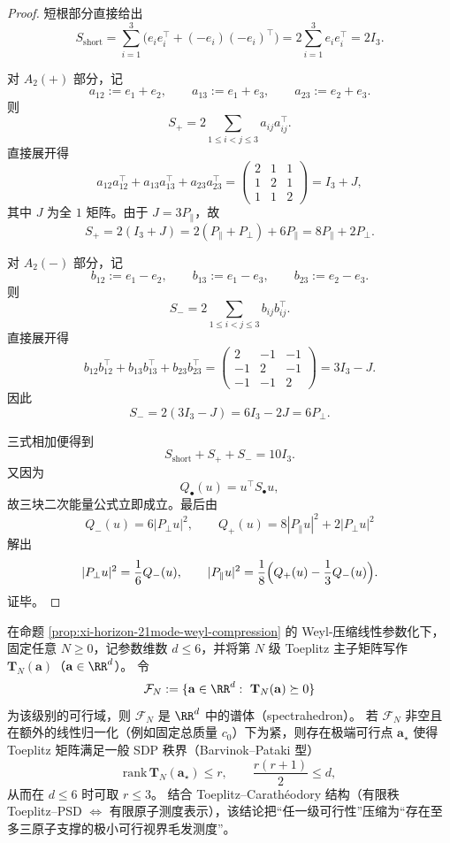 \begin{proof}
短根部分直接给出
\[
S_{\mathrm{short}}
=
\sum_{i=1}^{3}\bigl(e_ie_i^\top+(-e_i)(-e_i)^\top\bigr)
=
2\sum_{i=1}^{3}e_ie_i^\top
=
2I_3.
\]

对 \(A_2(+)\) 部分，记
\[
a_{12}:=e_1+e_2,\qquad
a_{13}:=e_1+e_3,\qquad
a_{23}:=e_2+e_3.
\]
则
\[
S_+=2\sum_{1\le i<j\le 3}a_{ij}a_{ij}^\top.
\]
直接展开得
\[
a_{12}a_{12}^\top+a_{13}a_{13}^\top+a_{23}a_{23}^\top
=
\begin{pmatrix}
2&1&1\\
1&2&1\\
1&1&2
\end{pmatrix}
=
I_3+J,
\]
其中 \(J\) 为全 \(1\) 矩阵。由于 \(J=3P_{\parallel}\)，故
\[
S_+=2(I_3+J)=2(P_{\parallel}+P_{\perp})+6P_{\parallel}=8P_{\parallel}+2P_{\perp}.
\]

对 \(A_2(-)\) 部分，记
\[
b_{12}:=e_1-e_2,\qquad
b_{13}:=e_1-e_3,\qquad
b_{23}:=e_2-e_3.
\]
则
\[
S_-=2\sum_{1\le i<j\le 3}b_{ij}b_{ij}^\top.
\]
直接展开得
\[
b_{12}b_{12}^\top+b_{13}b_{13}^\top+b_{23}b_{23}^\top
=
\begin{pmatrix}
2&-1&-1\\
-1&2&-1\\
-1&-1&2
\end{pmatrix}
=
3I_3-J.
\]
因此
\[
S_-=2(3I_3-J)=6I_3-2J=6P_{\perp}.
\]

三式相加便得到
\[
S_{\mathrm{short}}+S_++S_-=10I_3.
\]
又因为
\[
Q_{\bullet}(u)=u^\top S_{\bullet}u,
\]
故三块二次能量公式立即成立。最后由
\[
Q_-(u)=6|P_{\perp}u|^2,
\qquad
Q_+(u)=8|P_{\parallel}u|^2+2|P_{\perp}u|^2
\]
解出
\[
|P_{\perp}u|^2=\frac16Q_-(u),
\qquad
|P_{\parallel}u|^2=\frac18\Bigl(Q_+(u)-\frac13Q_-(u)\Bigr).
\]
证毕。
\end{proof}

\begin{corollary}\label{cor:xi-weyl-toeplitz-spectrahedron-rank3-atomic}
在命题 \ref{prop:xi-horizon-21mode-weyl-compression} 的 Weyl-压缩线性参数化下，固定任意 \(N\ge 0\)，记参数维数 \(d\le 6\)，并将第 \(N\) 级 Toeplitz 主子矩阵写作 \(\mathbf{T}_N(\mathbf{a})\)（\(\mathbf{a}\in\RR^d\)）。
令
\[
\mathcal{F}_N:=\{\mathbf{a}\in\RR^{d}:\ \mathbf{T}_N(\mathbf{a})\succeq 0\}
\]
为该级别的可行域，则 \(\mathcal{F}_N\) 是 \(\RR^{d}\) 中的谱体（spectrahedron）。
若 \(\mathcal{F}_N\) 非空且在额外的线性归一化（例如固定总质量 \(c_0\)）下为紧，则存在极端可行点 \(\mathbf{a}_\star\) 使得 Toeplitz 矩阵满足一般 SDP 秩界（Barvinok--Pataki 型）
\[
\mathrm{rank}\,\mathbf{T}_N(\mathbf{a}_\star)\le r,
\qquad
\frac{r(r+1)}{2}\le d,
\]
从而在 \(d\le 6\) 时可取 \(r\le 3\)。
结合 Toeplitz--Carath\'eodory 结构（有限秩 Toeplitz--PSD \(\Longleftrightarrow\) 有限原子测度表示），该结论把“任一级可行性”压缩为“存在至多三原子支撑的极小可行视界毛发测度”。
\end{corollary}

